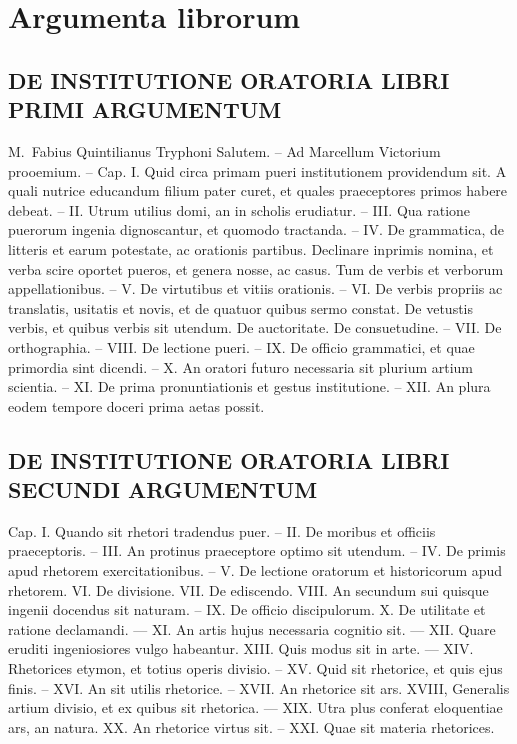 

\section*{Argumenta librorum}

\subsection*{DE INSTITUTIONE ORATORIA LIBRI PRIMI ARGUMENTUM}

M.~Fabius Quintilianus Tryphoni Salutem. – Ad Marcellum Victorium prooemium. – Cap. I. Quid circa primam pueri institutionem providendum sit. A quali nutrice educandum filium pater curet, et quales praeceptores primos habere debeat. – II. Utrum utilius domi, an in scholis erudiatur. – III. Qua ratione puerorum ingenia dignoscantur, et quomodo tractanda. – IV. De grammatica, de litteris et earum potestate, ac orationis partibus. Declinare inprimis nomina, et verba scire oportet pueros, et genera nosse, ac casus. Tum de verbis et verborum appellationibus. – V. De virtutibus et vitiis orationis. – VI. De verbis propriis ac translatis, usitatis et novis, et de quatuor quibus sermo constat. De vetustis verbis, et quibus verbis sit utendum. De auctoritate. De consuetudine. – VII. De orthographia. – VIII. De lectione pueri. – IX. De officio grammatici, et quae primordia sint dicendi. – X. An oratori futuro necessaria sit plurium artium scientia. – XI. De prima pronuntiationis et gestus institutione. – XII. An plura eodem tempore doceri prima aetas possit.

\subsection*{DE INSTITUTIONE ORATORIA LIBRI SECUNDI ARGUMENTUM}

Cap. I. Quando sit rhetori tradendus puer. – II. De moribus et officiis praeceptoris. – III. An protinus praeceptore optimo sit utendum. – IV. De primis apud rhetorem exercitationibus. – V. De lectione oratorum et historicorum apud rhetorem. VI. De divisione. VII. De ediscendo. VIII. An secundum sui quisque ingenii docendus sit naturam. – IX. De officio discipulorum. X. De utilitate et ratione declamandi. — XI. An artis hujus necessaria cognitio sit. — XII. Quare eruditi ingeniosiores vulgo habeantur. XIII. Quis modus sit in arte. — XIV. Rhetorices etymon, et totius operis divisio. – XV. Quid sit rhetorice, et quis ejus finis. – XVI. An sit utilis rhetorice. – XVII. An rhetorice sit ars. XVIII, Generalis artium divisio, et ex quibus sit rhetorica. — XIX. Utra plus conferat eloquentiae ars, an natura. XX. An rhetorice virtus sit. – XXI. Quae sit materia rhetorices.

